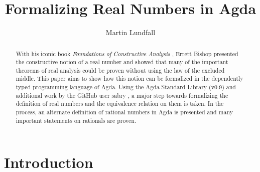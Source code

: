 \documentclass[11pt,a4paper]{article}
\title{Formalizing Real Numbers in Agda}
\author{Martin Lundfall}
\begin{document}
\maketitle
\begin{abstract}
With his iconic book \textit{Foundations of Constructive Analysis} \cite{bishop1985constructive}, Errett Bishop presented the constructive notion of a real number and showed that many of the important theorems of real analysis could be proven without using the law of the excluded middle. This paper aims to show how this notion can be formalized in the dependently typed programming language of Agda. Using the Agda Standard Library (v0.9) and additional work by the GitHub user sabry \cite{sabry}, a major step towards formalizing the definition of real numbers and the equivalence relation on them is taken. In the process, an alternate definition of rational numbers in Agda is presented and many important statements on rationals are proven.
\end{abstract}
\begin{comment}
\begin{abstract}
The decentralized infrastructure of the block chain technology Ethereum opens a new set of possibilities for sharing content in a programmable environment. In particular, it is highly suitable for creating a standard library of formalized mathematics to which everyone can add contributions. The database can in theory be automatically checked for validity and to avoid unnecessary repetitions, scanned for relevant results, or even serve as an interactive foundation of a formalized structure of knowledge. The trust-less nature of Ethereum allows communities to make democratic decisions on what contributions should be included in the database, or place bounties on particularly sought functions or proofs.
\end{abstract}
\end{comment}
\clearpage
\tableofcontents{}
\clearpage
\section{Introduction}\label{sec: Introduction}
\end{document}
